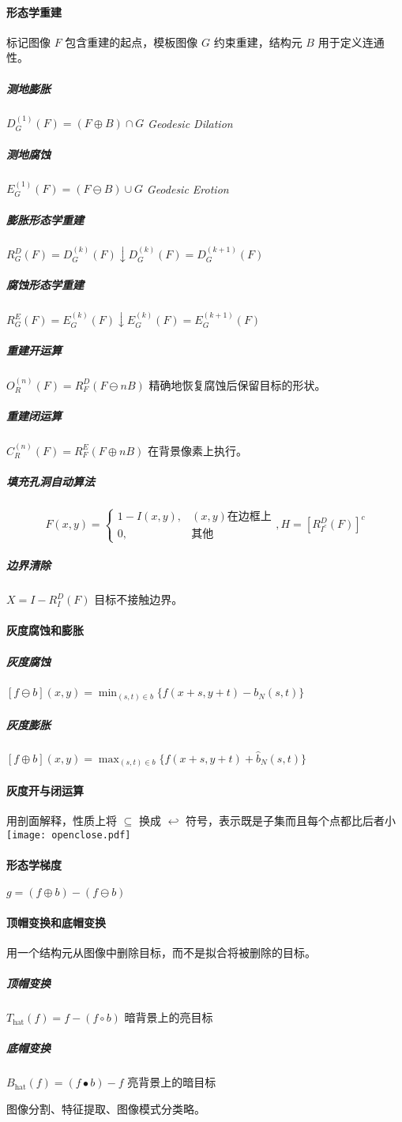 \documentclass[twocolumn]{ctexart}
\begin{document}
\paragraph{形态学重建} 标记图像 $F$ 包含重建的起点，模板图像 $G$ 约束重建，结构元 $B$ 用于定义连通性。
\subparagraph{测地膨胀} $D_G^{(1)}(F)=(F\oplus B)\cap G$ \emph{Geodesic Dilation}
\subparagraph{测地腐蚀} $E_G^{(1)}(F)=(F\ominus B)\cup G$ \emph{Geodesic Erotion}
\subparagraph{膨胀形态学重建} $R_G^D(F)=D_G^{(k)}(F)\downarrow D_G^{(k)}(F)=D_G^{(k+1)}(F)$
\subparagraph{腐蚀形态学重建} $R_G^E(F)=E_G^{(k)}(F)\downarrow E_G^{(k)}(F)=E_G^{(k+1)}(F)$
\subparagraph{重建开运算} $O_R^{(n)}(F)=R_F^D(F\ominus nB)$ 精确地恢复腐蚀后保留目标的形状。
\subparagraph{重建闭运算} $C_R^{(n)}(F)=R_F^E(F\oplus nB)$ 在背景像素上执行。
\subparagraph{填充孔洞自动算法}
$$F(x,y)=\begin{cases}
    1-I(x,y), &(x,y)\text{在边框上}\\
    0, &\text{其他}
\end{cases}, H=[R_{I^c}^D(F)]^c$$
\subparagraph{边界清除} $X=I-R_I^D(F)$ 目标不接触边界。
\paragraph{灰度腐蚀和膨胀}
\subparagraph{灰度腐蚀} $[f\ominus b](x,y)=\min_{(s,t)\in b}\{f(x+s,y+t)-b_N(s,t)\}$
\subparagraph{灰度膨胀} $[f\oplus b](x,y)=\max_{(s,t)\in b}\{f(x+s,y+t)+\hat{b}_N(s,t)\}$
\paragraph{灰度开与闭运算} 用剖面解释，性质上将 $\subseteq$ 换成 $\hookleftarrow$ 符号，表示既是子集而且每个点都比后者小\\
\texttt{[image: openclose.pdf]}
\paragraph{形态学梯度} $g=(f\oplus b)-(f\ominus b)$
\paragraph{顶帽变换和底帽变换} 用一个结构元从图像中删除目标，而不是拟合将被删除的目标。
\subparagraph{顶帽变换} $T_\text{hat}(f)=f-(f\circ b)$ 暗背景上的亮目标
\subparagraph{底帽变换} $B_\text{hat}(f)=(f\bullet b)-f$ 亮背景上的暗目标
\vspace*{3ex}

图像分割、特征提取、图像模式分类略。
\end{document}
